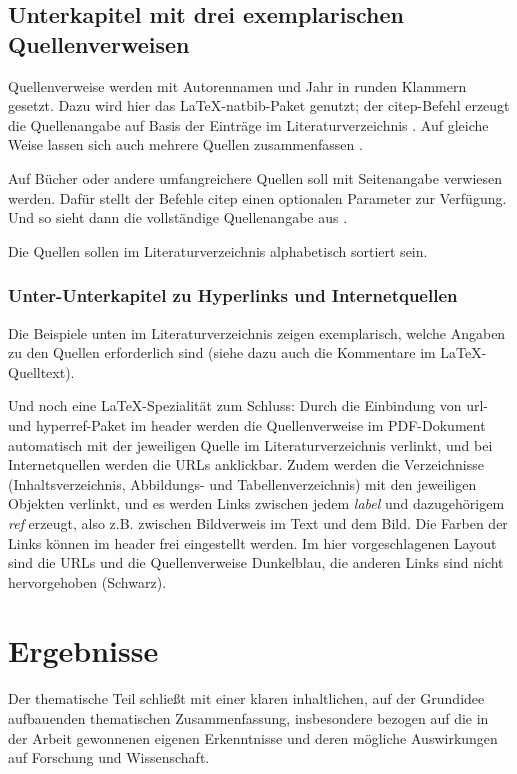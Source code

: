 \section{Unterkapitel mit drei exemplarischen Quellenverweisen}

Quellenverweise werden mit Autorennamen und Jahr in runden Klammern gesetzt. Dazu wird hier das \LaTeX-natbib-Paket genutzt; der citep-Befehl erzeugt die Quellenangabe auf Basis der Einträge im Literaturverzeichnis \citep{bluray}. Auf gleiche Weise lassen sich auch mehrere Quellen zusammenfassen \citep{dooley_streicher,stephenson}.

Auf Bücher oder andere umfangreichere Quellen soll mit Seitenangabe verwiesen werden. Dafür stellt der Befehle citep  einen optionalen Parameter zur Verfügung. Und so sieht dann die vollständige Quellenangabe aus \citep[116]{kuttruff}.

Die Quellen sollen im Literaturverzeichnis alphabetisch sortiert sein.


\subsection{Unter-Unterkapitel zu Hyperlinks und Internetquellen}

Die Beispiele unten im Literaturverzeichnis zeigen exemplarisch, welche Angaben zu den Quellen erforderlich sind (siehe dazu auch die Kommentare im \LaTeX-Quelltext).

Und noch eine \LaTeX-Spezialität zum Schluss: Durch die Einbindung von url- und hyperref-Paket im header werden die Quellenverweise im PDF-Dokument automatisch mit der jeweiligen Quelle im Literaturverzeichnis verlinkt, und bei Internetquellen werden die URLs anklickbar. Zudem werden die Verzeichnisse (Inhaltsverzeichnis, Abbildungs- und Tabellenverzeichnis) mit den jeweiligen Objekten verlinkt, und es werden Links zwischen jedem \emph{label} und  dazugehörigem \emph{ref} erzeugt, also z.B. zwischen Bildverweis im Text und dem Bild. Die Farben der Links können im header frei eingestellt werden. Im hier vorgeschlagenen Layout sind die URLs und die Quellenverweise Dunkelblau, die anderen Links sind nicht hervorgehoben (Schwarz).


\chapter{Ergebnisse}

Der thematische Teil schließt mit einer klaren inhaltlichen, auf der Grundidee aufbauenden thematischen Zusammenfassung, insbesondere bezogen auf die in der Arbeit gewonnenen eigenen Erkenntnisse und deren mögliche Auswirkungen auf Forschung und Wissenschaft.

